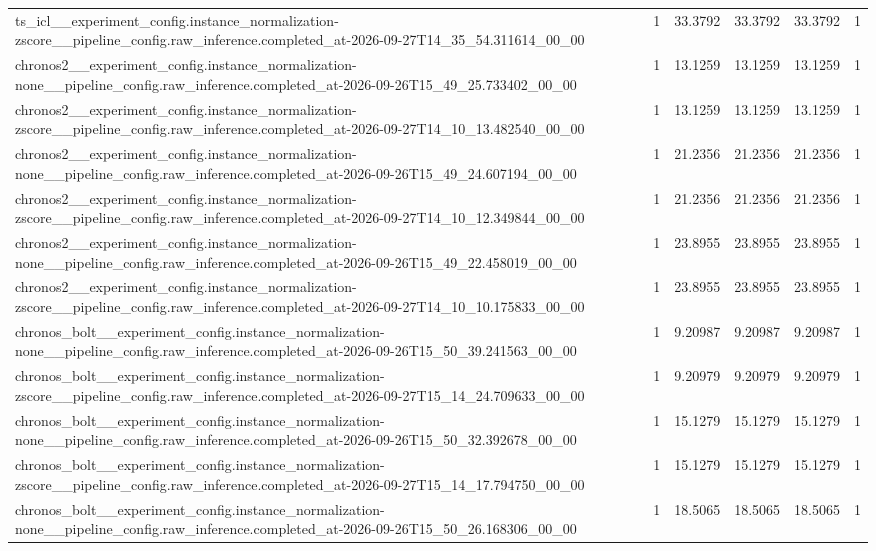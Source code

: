 \begin{tabular}{llllll}
ts\_icl\_\_experiment\_config.instance\_normalization-zscore\_\_pipeline\_config.raw\_inference.completed\_at-2026-09-27T14\_35\_54.311614\_00\_00 & 1 & 33.3792 & 33.3792 & 33.3792 & 1 \\
chronos2\_\_experiment\_config.instance\_normalization-none\_\_pipeline\_config.raw\_inference.completed\_at-2026-09-26T15\_49\_25.733402\_00\_00 & 1 & 13.1259 & 13.1259 & 13.1259 & 1 \\
chronos2\_\_experiment\_config.instance\_normalization-zscore\_\_pipeline\_config.raw\_inference.completed\_at-2026-09-27T14\_10\_13.482540\_00\_00 & 1 & 13.1259 & 13.1259 & 13.1259 & 1 \\
chronos2\_\_experiment\_config.instance\_normalization-none\_\_pipeline\_config.raw\_inference.completed\_at-2026-09-26T15\_49\_24.607194\_00\_00 & 1 & 21.2356 & 21.2356 & 21.2356 & 1 \\
chronos2\_\_experiment\_config.instance\_normalization-zscore\_\_pipeline\_config.raw\_inference.completed\_at-2026-09-27T14\_10\_12.349844\_00\_00 & 1 & 21.2356 & 21.2356 & 21.2356 & 1 \\
chronos2\_\_experiment\_config.instance\_normalization-none\_\_pipeline\_config.raw\_inference.completed\_at-2026-09-26T15\_49\_22.458019\_00\_00 & 1 & 23.8955 & 23.8955 & 23.8955 & 1 \\
chronos2\_\_experiment\_config.instance\_normalization-zscore\_\_pipeline\_config.raw\_inference.completed\_at-2026-09-27T14\_10\_10.175833\_00\_00 & 1 & 23.8955 & 23.8955 & 23.8955 & 1 \\
chronos\_bolt\_\_experiment\_config.instance\_normalization-none\_\_pipeline\_config.raw\_inference.completed\_at-2026-09-26T15\_50\_39.241563\_00\_00 & 1 & 9.20987 & 9.20987 & 9.20987 & 1 \\
chronos\_bolt\_\_experiment\_config.instance\_normalization-zscore\_\_pipeline\_config.raw\_inference.completed\_at-2026-09-27T15\_14\_24.709633\_00\_00 & 1 & 9.20979 & 9.20979 & 9.20979 & 1 \\
chronos\_bolt\_\_experiment\_config.instance\_normalization-none\_\_pipeline\_config.raw\_inference.completed\_at-2026-09-26T15\_50\_32.392678\_00\_00 & 1 & 15.1279 & 15.1279 & 15.1279 & 1 \\
chronos\_bolt\_\_experiment\_config.instance\_normalization-zscore\_\_pipeline\_config.raw\_inference.completed\_at-2026-09-27T15\_14\_17.794750\_00\_00 & 1 & 15.1279 & 15.1279 & 15.1279 & 1 \\
chronos\_bolt\_\_experiment\_config.instance\_normalization-none\_\_pipeline\_config.raw\_inference.completed\_at-2026-09-26T15\_50\_26.168306\_00\_00 & 1 & 18.5065 & 18.5065 & 18.5065 & 1 \\

\end{tabular}

